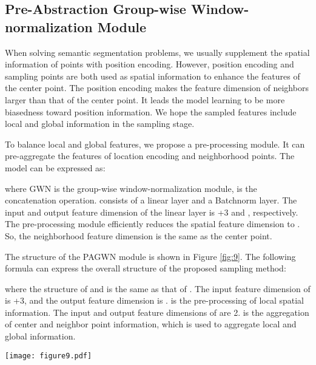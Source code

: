 \documentclass[10pt,twocolumn,letterpaper]{article}
\begin{document}
    \subsection{Pre-Abstraction Group-wise Window-normalization Module}

        When solving semantic segmentation problems, we usually supplement the spatial information of points with position encoding.
        However, position encoding and sampling points are both used as spatial information to enhance the features of the center point.
        The position encoding makes the feature dimension of neighbors larger than that of the center point.
        It leads the model learning to be more biasedness toward position information.
        We hope the sampled features include local and global information in the sampling stage.

        To balance local and global features, we propose a pre-processing module. It can pre-aggregate the features of location encoding and neighborhood points. The model can be expressed as:
        
        where GWN is the group-wise window-normalization module,
         is the concatenation operation.  consists of a linear layer and a Batchnorm layer. The input and output feature dimension of the linear layer is +3 and , respectively. The pre-processing module efficiently reduces the spatial feature dimension to . So, the neighborhood feature dimension is the same as the center point.

        The structure of the PAGWN module is shown in Figure \ref{fig:9}.
        The following formula can express the overall structure of the proposed sampling method:

where the structure of  and  is the same as that of .
        The input feature dimension of  is +3, and the output feature dimension is .
         is the pre-processing of local spatial information.
        The input and output feature dimensions of  are 2.
         is the aggregation of center and neighbor point information, which is used to aggregate local and global information.
        \begin{figure*}[!htb]
        \centering
        \texttt{[image: figure9.pdf]}
        \caption{Illustration of our pre-abstraction group-wise window-normalization module. GWN module normalizes the volume of the local region and provides a variety of information. PAGWN module pre-aggregates the features of location encoding and neighborhood points to balance local and global features.}
        \label{fig:9}
        \end{figure*}
\end{document}
